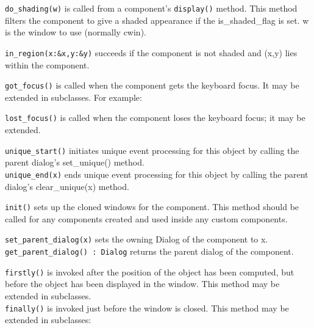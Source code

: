 \texttt{do\_shading(w)} is called from a component's
\texttt{display()}
method. This method filters the component to give a shaded appearance
if the is\_shaded\_flag is set. w is the window to use (normally cwin).

\texttt{in\_region(x:\&x,y:\&y)} succeeds if the component is not shaded and
(x,y) lies within the component.

\texttt{got\_focus()} is called when the component gets the keyboard focus. It
may be extended in subclasses. For example:


\texttt{lost\_focus()} is called when the component loses the keyboard focus; it
may be extended.

\texttt{unique\_start()} initiates unique event processing for this object by
calling the parent dialog's set\_unique()
method.\\
\texttt{unique\_end(x)} ends unique event processing for this object by calling
the parent dialog's clear\_unique(x) method.

\texttt{init()} sets up the cloned windows for the component. This method should
be called for any components created and used inside any custom
components.

\texttt{set\_parent\_dialog(x)} sets the owning Dialog of the component to
x.\\
\texttt{get\_parent\_dialog() : Dialog} returns the parent dialog of the
component.

\texttt{firstly()} is invoked after the position of the object has been
computed,
but before the object has been displayed in the window. This method may
be extended in subclasses.\\
\texttt{finally()} is invoked just before the window is closed. This method may
be extended in subclasses:


